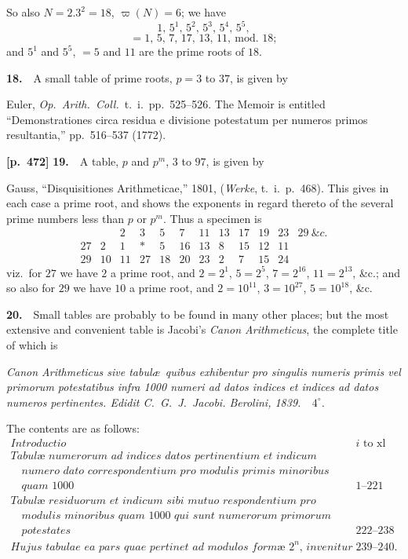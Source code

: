 \documentclass[11pt,a4paper]{article}
\providecommand{\totient}{\varpi}
\begin{document}
So also $N=2.3^2=18$, $\totient(N)=6$; we have
\[
1,\,5^1,\,5^2,\,5^3,\,5^4,\,5^5,
\]
\[
=1,\,5,\,7,\,17,\,13,\,11,\ \text{mod.\ 18};
\]
and $5^1$ and $5^5$, $=5$ and $11$ are the prime roots of $18$.

\textbf{18.}\ \ A small table of prime roots, $p=3$ to $37$, is given by

Euler, \textit{Op.\ Arith.\ Coll.}\ t.~i.\ pp.~525--526.   The Memoir is entitled ``Demonstrationes circa residua e divisione potestatum per numeros primos resultantia,'' pp.~516--537 (1772).

\bigskip
\noindent\textbf{[p.~472]}\quad
\textbf{19.}\ \ A table, $p$ and $p^m$, $3$ to $97$, is given by

Gauss, ``Disquisitiones Arithmeticae,'' 1801, (\textit{Werke}, t.~i.\ p.~468).   This gives in each case a prime root, and shows the exponents in regard thereto of the several prime numbers less than $p$ or $p^m$.   Thus a specimen is
\[
\begin{array}{c|c|cccccccccc}
  &   & 2 & 3 & 5 & 7 & 11 & 13 & 17 & 19 & 23 & 29\ \&c. \\\hline
27 & 2 & 1 & * & 5 & 16 & 13 & 8 & 15 & 12 & 11 & \\
29 & 10& 11& 27 & 18 & 20 & 23 & 2 & 7 & 15 & 24 &
\end{array}
\]
viz.\ for $27$ we have $2$ a prime root, and $2=2^1$, $5=2^5$, $7=2^{16}$, $11=2^{13}$, \&c.; and so also for $29$ we have $10$ a prime root, and $2=10^{11}$, $3=10^{27}$, $5=10^{18}$, \&c.

\textbf{20.}\ \ Small tables are probably to be found in many other places; but the most extensive and convenient table is Jacobi's \textit{Canon Arithmeticus}, the complete title of which is

\textit{Canon Arithmeticus sive tabul\ae\ quibus exhibentur pro singulis numeris primis vel primorum potestatibus infra 1000 numeri ad datos indices et indices ad datos numeros pertinentes.   Edidit C.\ G.\ J.\ Jacobi.   Berolini, 1839.\ \ $4^\circ$.}

The contents are as follows:
\[
\begin{array}{lr}
\textit{Introductio} & i\text{ to }\text{xl} \\
\textit{Tabul\ae\ numerorum ad indices datos pertinentium et indicum} & \\
\quad\textit{numero dato correspondentium pro modulis primis minoribus} & \\
\quad\textit{quam 1000} & 1\text{--}221 \\
\textit{Tabul\ae\ residuorum et indicum sibi mutuo respondentium pro} & \\
\quad\textit{modulis minoribus quam 1000 qui sunt numerorum primorum} & \\
\quad\textit{potestates} & 222\text{--}238 \\
\textit{Hujus tabulae ea pars quae pertinet ad modulos form\ae\ $2^n$, invenitur} & 239\text{--}240.
\end{array}
\]
\end{document}
